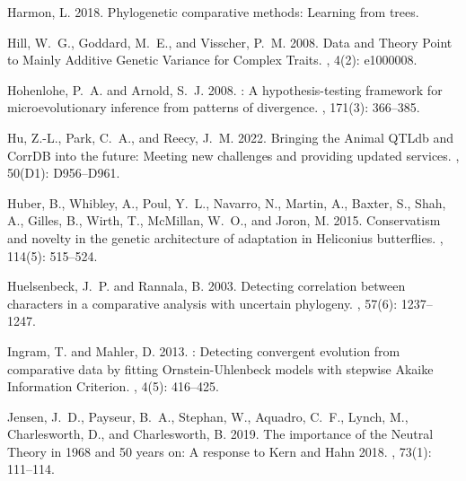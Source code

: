 \documentclass{article}
\begin{document}
\begin{thebibliography}{}
    Harmon, L. 2018.
    \newblock Phylogenetic comparative methods: Learning from trees.

    Hill, W.~G., Goddard, M.~E., and Visscher, P.~M. 2008.
    \newblock Data and {{Theory Point}} to {{Mainly Additive Genetic Variance}} for
        {{Complex Traits}}.
    , {4}(2): e1000008.

    Hohenlohe, P.~A. and Arnold, S.~J. 2008.
    : {{A}} hypothesis-testing framework for microevolutionary
    inference from patterns of divergence.
    , {171}(3): 366--385.

    Hu, Z.-L., Park, C.~A., and Reecy, J.~M. 2022.
    \newblock Bringing the {{Animal QTLdb}} and {{CorrDB}} into the future: Meeting
    new challenges and providing updated services.
    , {50}(D1): D956--D961.

    Huber, B., Whibley, A., Poul, Y.~L., Navarro, N., Martin, A., Baxter, S., Shah,
    A., Gilles, B., Wirth, T., McMillan, W.~O., and Joron, M. 2015.
    \newblock Conservatism and novelty in the genetic architecture of adaptation in
        {{Heliconius}} butterflies.
    , {114}(5): 515--524.

    Huelsenbeck, J.~P. and Rannala, B. 2003.
    \newblock Detecting correlation between characters in a comparative analysis
    with uncertain phylogeny.
    , {57}(6): 1237--1247.

    Ingram, T. and Mahler, D. 2013.
    : Detecting convergent evolution from comparative data by
    fitting {{Ornstein-Uhlenbeck}} models with stepwise {{Akaike Information
    Criterion}}.
    , {4}(5): 416--425.

    Jensen, J.~D., Payseur, B.~A., Stephan, W., Aquadro, C.~F., Lynch, M.,
    Charlesworth, D., and Charlesworth, B. 2019.
    \newblock The importance of the {{Neutral Theory}} in 1968 and 50 years on:
        {{A}} response to {{Kern}} and {{Hahn}} 2018.
    , {73}(1): 111--114.


\end{thebibliography}
\end{document}
